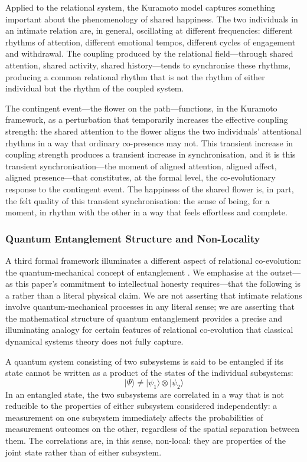 Applied to the relational system, the Kuramoto model captures something important about the phenomenology of shared happiness. The two individuals in an intimate relation are, in general, oscillating at different frequencies: different rhythms of attention, different emotional tempos, different cycles of engagement and withdrawal. The coupling produced by the relational field---through shared attention, shared activity, shared history---tends to synchronise these rhythms, producing a common relational rhythm that is not the rhythm of either individual but the rhythm of the coupled system.

The contingent event---the flower on the path---functions, in the Kuramoto framework, as a perturbation that temporarily increases the effective coupling strength: the shared attention to the flower aligns the two individuals' attentional rhythms in a way that ordinary co-presence may not. This transient increase in coupling strength produces a transient increase in synchronisation, and it is this transient synchronisation---the moment of aligned attention, aligned affect, aligned presence---that constitutes, at the formal level, the co-evolutionary response to the contingent event. The happiness of the shared flower is, in part, the felt quality of this transient synchronisation: the sense of being, for a moment, in rhythm with the other in a way that feels effortless and complete.

\subsubsection{Quantum Entanglement Structure and Non-Locality}
\label{p14:subsubsec:entanglement}

\noindent
A third formal framework illuminates a different aspect of relational co-evolution: the quantum-mechanical concept of entanglement \parencite{einstein1935}. We emphasise at the outset---as this paper's commitment to intellectual honesty requires---that the following is a  rather than a literal physical claim. We are not asserting that intimate relations involve quantum-mechanical processes in any literal sense; we are asserting that the mathematical structure of quantum entanglement provides a precise and illuminating analogy for certain features of relational co-evolution that classical dynamical systems theory does not fully capture.

A quantum system consisting of two subsystems is said to be entangled if its state cannot be written as a product of the states of the individual subsystems:
\begin{equation}
|\Psi\rangle \neq |\psi_1\rangle \otimes |\psi_2\rangle
\end{equation}
In an entangled state, the two subsystems are correlated in a way that is not reducible to the properties of either subsystem considered independently: a measurement on one subsystem immediately affects the probabilities of measurement outcomes on the other, regardless of the spatial separation between them. The correlations are, in this sense, non-local: they are properties of the joint state rather than of either subsystem.

